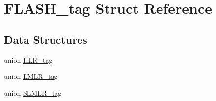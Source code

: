 \hypertarget{structFLASH__tag}{}\section{F\+L\+A\+S\+H\+\_\+tag Struct Reference}
\label{structFLASH__tag}
\subsection*{Data Structures}
\begin{DoxyCompactItemize}
\item 
union \mbox{\hyperlink{unionFLASH__tag_1_1HLR__tag}{H\+L\+R\+\_\+tag}}
\item 
union \mbox{\hyperlink{unionFLASH__tag_1_1LMLR__tag}{L\+M\+L\+R\+\_\+tag}}
\item 
union \mbox{\hyperlink{unionFLASH__tag_1_1SLMLR__tag}{S\+L\+M\+L\+R\+\_\+tag}}
\end{DoxyCompactItemize}
